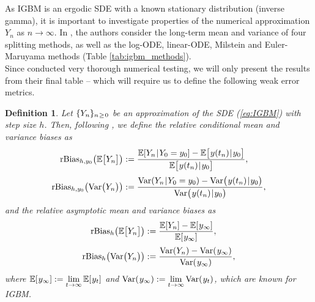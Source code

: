 \documentclass[sn-mathphys-num]{sn-jnl}%
\newtheorem{definition}{Definition}%
\newcommand{\E}{\mathbb{E}}
\newcommand{\m}{\hspace{0.25mm}}
\newcommand{\var}{\mathrm{Var}}
\begin{document}
As IGBM is an ergodic SDE with a known stationary distribution (inverse gamma), it is important to investigate properties of the numerical approximation $Y_n$ as $n\rightarrow\infty$.
In \cite{tubikanec2022igbm}, the authors consider the long-term mean and variance of four splitting methods, as well as the log-ODE, linear-ODE, Milstein and Euler-Maruyama methods (Table \ref{tab:igbm_methods}).\\ \noindent
Since \cite{tubikanec2022igbm} conducted very thorough numerical testing, we will only present the results from their final table -- which will require us to define the following weak error metrics.
\medbreak
\begin{definition} Let $\{Y_n\}_{n\m\geq\m 0}$ be an approximation of the SDE (\ref{eq:IGBM}) with step size $h$. Then, following \cite{tubikanec2022igbm}, we define the relative conditional mean and variance biases as
\begin{align*}
\mathrm{rBias}_{h, y_0}\big(\E\big[Y_n\big]\big) & :=  \frac{\E[Y_n\m|\m Y_0 = y_0] - \E\big[\m y(t_n)\m|\m y_0\big]}{\E\big[\m y(t_n)\m|\m y_0\big]},\\[2pt]
\mathrm{rBias}_{h, y_0}\big(\var\big(Y_n\big)\big) & :=  \frac{\var(Y_n\m|\m Y_0 = y_0) - \var\big(\m y(t_n)\m|\m y_0\big)}{\var\big(\m y(t_n)\m|\m y_0\big)},
\end{align*}
and the relative asymptotic mean and variance biases as
\begin{align*}
\mathrm{rBias}_{h}\big(\E\big[Y_n\big]\big) & :=  \frac{\E[Y_n] - \E[\m y_\infty]}{\E[\m y_\infty]},\\[2pt]
\mathrm{rBias}_{h}\big(\var\big(Y_n\big)\big) & :=  \frac{\var(Y_n) - \var(\m y_\infty)}{\var(\m y_\infty)},
\end{align*}
where $\displaystyle \E[\m y_\infty] := \lim_{t\rightarrow\infty} \E[\m y_t]$ and $\displaystyle \var(\m y_\infty) := \lim_{t\rightarrow\infty} \var(\m y_t)$, which are known for IGBM.
\end{definition}\newpage
\end{document}
